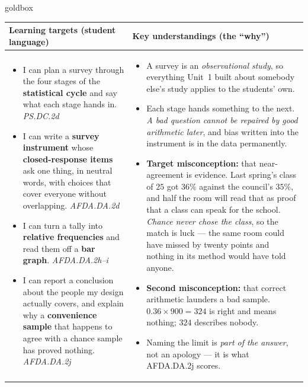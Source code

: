 \documentclass[10pt]{article}
\begin{document}
\renewcommand{\arraystretch}{1.4}
\boxguard
\begin{skillbox}{goldbox}
\begin{tabularx}{\linewidth}{@{}X|X@{}}
\textbf{Learning targets (student language)} & \textbf{Key understandings (the ``why'')} \\[2pt]
\hline
\vspace{-6pt}
\begin{itemize}[leftmargin=1.1em, nosep, after=\vspace{2pt}]
  \item I can plan a survey through the four stages of the \textbf{statistical cycle} and say
        what each stage hands in. \hfill \textit{PS.DC.2d}
  \item I can write a \textbf{survey instrument} whose \textbf{closed-response items} ask one
        thing, in neutral words, with choices that cover everyone without overlapping.
        \hfill \textit{AFDA.DA.2d}
  \item I can turn a tally into \textbf{relative frequencies} and read them off a \textbf{bar
        graph}. \hfill \textit{AFDA.DA.2h--i}
  \item I can report a conclusion about the people my design actually covers, and explain why a
        \textbf{convenience sample} that happens to agree with a chance sample has proved
        nothing. \hfill \textit{AFDA.DA.2j}
\end{itemize}
&
\vspace{-6pt}
\begin{itemize}[leftmargin=1.1em, nosep, after=\vspace{2pt}]
  \item A survey is an \emph{observational study}, so everything Unit~1 built about somebody
        else's study applies to the students' own.
  \item Each stage hands something to the next. \emph{A bad question cannot be repaired by good
        arithmetic later}, and bias written into the instrument is in the data permanently.
  \item \textbf{Target misconception:} that near-agreement is evidence. Last spring's class of
        $25$ got $36\%$ against the council's $35\%$, and half the room will read that as
        proof that a class can speak for the school. \emph{Chance never chose the class}, so the
        match is luck --- the same room could have missed by twenty points and nothing in its
        method would have told anyone.
  \item \textbf{Second misconception:} that correct arithmetic launders a bad sample.
        $0.36 \times 900 = 324$ is right and means nothing; $324$ describes nobody.
  \item Naming the limit is \emph{part of the answer}, not an apology --- it is what
        AFDA.DA.2j scores.
\end{itemize}
\end{tabularx}
\end{skillbox}
\end{document}
